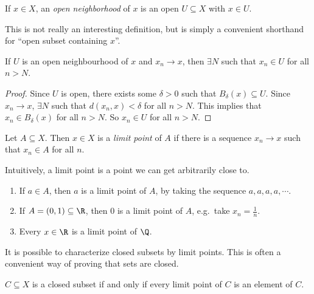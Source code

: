 \documentclass[a4paper]{article}
\begin{document}
\begin{defi}
  If $x\in X$, an \emph{open neighborhood} of $x$ is an open $U\subseteq X$ with $x\in U$.
\end{defi}
This is not really an interesting definition, but is simply a convenient shorthand for ``open subset containing $x$''.

\begin{lemma}
  If $U$ is an open neighbourhood of $x$ and $x_n \to x$, then $\exists N$ such that $x_n \in U$ for all $n > N$.
\end{lemma}

\begin{proof}
  Since $U$ is open, there exists some $\delta > 0$ such that $B_\delta(x)\subseteq U$. Since $x_n \to x$, $\exists N$ such that $d(x_n, x) < \delta$ for all $n > N$. This implies that $x_n \in B_\delta(x)$ for all $n > N$. So $x_n \in U$ for all $n > N$.
\end{proof}

\begin{defi}
  Let $A\subseteq X$. Then $x\in X$ is a \emph{limit point} of $A$ if there is a sequence $x_n \to x$ such that $x_n \in A$ for all $n$.
\end{defi}
Intuitively, a limit point is a point we can get arbitrarily close to.

\begin{eg}\leavevmode
  \begin{enumerate}
    \item If $a\in A$, then $a$ is a limit point of $A$, by taking the sequence $a, a, a, a, \cdots$.
    \item If $A = (0, 1)\subseteq \R$, then $0$ is a limit point of $A$, e.g.\ take $x_n = \frac{1}{n}$.
    \item Every $x\in \R$ is a limit point of $\Q$.
  \end{enumerate}
\end{eg}

It is possible to characterize closed subsets by limit points. This is often a convenient way of proving that sets are closed.
\begin{prop}
  $C\subseteq X$ is a closed subset if and only if every limit point of $C$ is an element of $C$.
\end{prop}
\end{document}
